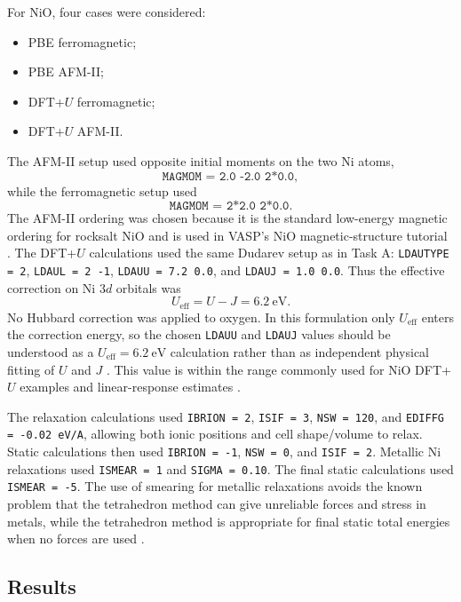 For NiO, four cases were considered:
\begin{itemize}
  \item PBE ferromagnetic;
  \item PBE AFM-II;
  \item DFT+\(U\) ferromagnetic;
  \item DFT+\(U\) AFM-II.
\end{itemize}
The AFM-II setup used opposite initial moments on the two Ni atoms,
\[
  \texttt{MAGMOM = 2.0 -2.0 2*0.0},
\]
while the ferromagnetic setup used
\[
  \texttt{MAGMOM = 2*2.0 2*0.0}.
\]
The AFM-II ordering was chosen because it is the standard low-energy magnetic
ordering for rocksalt NiO and is used in VASP's NiO magnetic-structure
tutorial \cite{vasp-nio-magnetism}.
The DFT+\(U\) calculations used the same Dudarev setup as in Task A:
\texttt{LDAUTYPE = 2}, \texttt{LDAUL = 2 -1},
\texttt{LDAUU = 7.2 0.0}, and \texttt{LDAUJ = 1.0 0.0}.  Thus the effective
correction on Ni \(3d\) orbitals was
\[
  U_{\mathrm{eff}} = U - J = 6.2~\mathrm{eV}.
\]
No Hubbard correction was applied to oxygen.  In this formulation only
\(U_{\mathrm{eff}}\) enters the correction energy, so the chosen
\texttt{LDAUU} and \texttt{LDAUJ} values should be understood as a
\(U_{\mathrm{eff}} = 6.2~\mathrm{eV}\) calculation rather than as independent
physical fitting of \(U\) and \(J\) \cite{dudarev,vasp-ldautype}.  This value is
within the range commonly used for NiO DFT+\(U\) examples and linear-response
estimates \cite{vasp-nio-magnetism,vasp-strong-corr}.

The relaxation calculations used \texttt{IBRION = 2}, \texttt{ISIF = 3},
\texttt{NSW = 120}, and \texttt{EDIFFG = -0.02 eV/A}, allowing both ionic
positions and cell shape/volume to relax.  Static calculations then used
\texttt{IBRION = -1}, \texttt{NSW = 0}, and \texttt{ISIF = 2}.  Metallic Ni
relaxations used \texttt{ISMEAR = 1} and \texttt{SIGMA = 0.10}.  The final
static calculations used \texttt{ISMEAR = -5}.  The use of smearing for metallic
relaxations avoids the known problem that the tetrahedron method can give
unreliable forces and stress in metals, while the tetrahedron method is
appropriate for final static total energies when no forces are used
\cite{vasp-ibrion,vasp-isif,vasp-ediffg,vasp-ismear}.

\subsection{Results}


